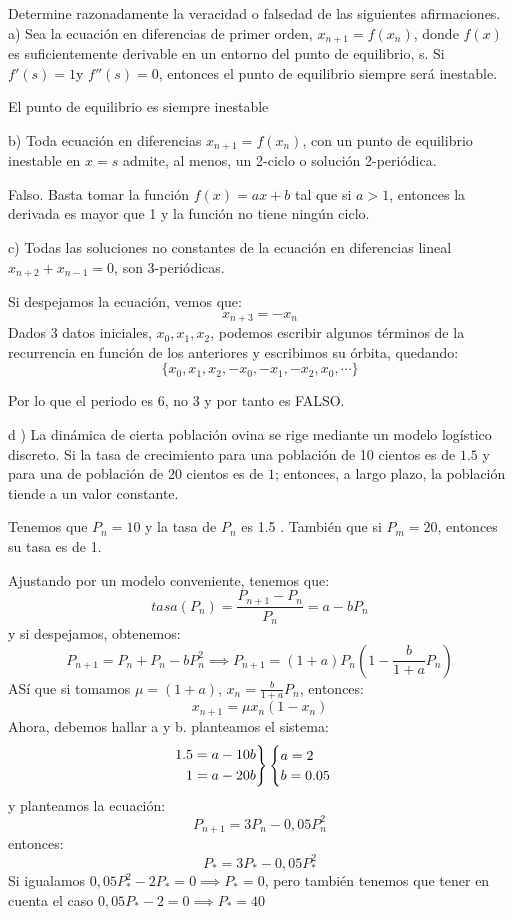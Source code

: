 \documentclass[11pt, a4paper]{article}
\newif\IfInSansMode
\theoremstyle{theorem-style}
\theoremstyle{definition-style}
\theoremstyle{remark-style}
\theoremstyle{example-style}
\newenvironment{rcases}
{\left.\begin{aligned}}
    {\end{aligned}\right\rbrace}
\begin{document}
    Determine razonadamente la veracidad o falsedad de las siguientes afirmaciones.
    a) Sea la ecuación en diferencias de primer orden, $x _{n+1} = f (x_n )$, donde $f(x)$ es suficientemente derivable en
    un entorno del punto de equilibrio, s. Si $f'(s) = 1 $y $f'' (s) = 0$, entonces el punto de equilibrio siempre será
    inestable.

    El punto de equilibrio es siempre inestable


    b) Toda ecuación en diferencias $x _{n+1} = f (x_n)$, con un punto de equilibrio inestable en $x = s$ admite, al menos,
    un 2-ciclo o solución 2-periódica.

    Falso. Basta tomar la función $f(x) = ax+b$ tal que si $a>1$, entonces la derivada es mayor que 1 y la función no tiene ningún ciclo.

    c) Todas las soluciones no constantes de la ecuación en diferencias lineal $x_{n+2}+ x_{n-1} = 0$, son 3-periódicas.

    Si despejamos la ecuación, vemos que:
    \[
        x_{n+3} = -x_n
    \]
    Dados 3 datos iniciales, $x_0,x_1,x_2$, podemos escribir algunos términos de la recurrencia en función de los anteriores y escribimos su órbita, quedando:
    \[
        \{x_0,x_1,x_2,-x_0,-x_1,-x_2,x_0,\cdots\}
    \]

    Por lo que el periodo es 6, no 3 y por tanto es FALSO.

    d ) La dinámica de cierta población ovina se rige mediante un modelo logístico discreto. Si la tasa de crecimiento
    para una población de 10 cientos es de $1.5$ y para una de población de 20 cientos es de $1$; entonces, a largo plazo, la población tiende a un valor constante.

    Tenemos que $P_n=10$ y la tasa de $P_n$ es 1.5 . También que si $P_m = 20$, entonces su tasa es de 1.

    Ajustando por un modelo conveniente, tenemos que:
    \[
        tasa(P_n) = \frac{P _{n+1} - P_n}{P_n} = a -bP_n
    \]
    y si despejamos, obtenemos:
    \[
        P _{n+1} = P_n + P_n -b P_n^2 \implies P _{n+1} = (1+a)P_n(1-\frac{b}{1+a}P_n)
    \]
    ASí que si tomamos $\mu = (1+a)$, $x_n = \frac{b}{1+a}P_n$, entonces:
    \[
        x _{n+1} = \mu x_n (1-x_n)
    \]
    Ahora, debemos hallar a y b. planteamos el sistema:
    \[
        \begin{rcases}
            1.5 = a-10b\\
            1 = a-20b
        \end{rcases} 
        \begin{cases}
            a = 2 \\
            b = 0.05
        \end{cases}
    \]
    y planteamos la ecuación:
    \[
        P _{n+1} = 3P_n - 0,05 P_n^2
    \]
    entonces:
    \[
        P_* = 3P_* - 0,05P_*^2
    \]
    Si igualamos $0,05P_*^2 -2P_* = 0 \implies P_* = 0$, pero también tenemos que tener en cuenta el caso $0,05P_* - 2 = 0 \implies P_* = 40$
\end{document}
